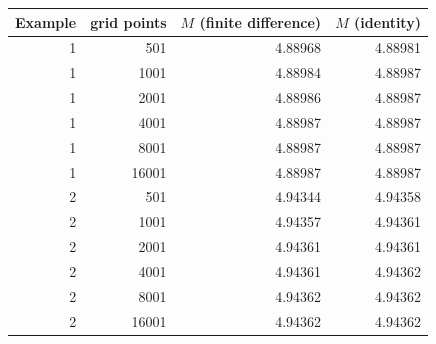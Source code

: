 \begin{tabular}{rrrr}
\toprule
Example & grid points & $M$ (finite difference) & $M$ (identity)\\
\midrule
1 & 501 & 4.88968 & 4.88981\\
1 & 1001 & 4.88984 & 4.88987\\
1 & 2001 & 4.88986 & 4.88987\\
1 & 4001 & 4.88987 & 4.88987\\
1 & 8001 & 4.88987 & 4.88987\\
1 & 16001 & 4.88987 & 4.88987\\
2 & 501 & 4.94344 & 4.94358\\
2 & 1001 & 4.94357 & 4.94361\\
2 & 2001 & 4.94361 & 4.94361\\
2 & 4001 & 4.94361 & 4.94362\\
2 & 8001 & 4.94362 & 4.94362\\
2 & 16001 & 4.94362 & 4.94362\\
\bottomrule
\end{tabular}
